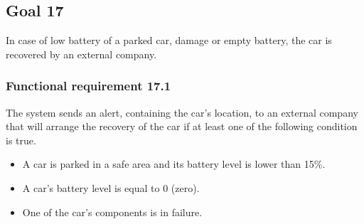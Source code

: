 \subsection{Goal 17}
In case of low battery of a parked car, damage or empty battery, the car is recovered by an external company. 

\setcounter{secnumdepth}{3}
\subsubsection{Functional requirement 17.1}
The system sends an alert, containing the car's location, to an external company that will arrange the recovery of the car if at least one of the following condition is true.

\begin{itemize}
	\item A car is parked in a safe area and its battery level is lower than 15\%.
	\item A car's battery level is equal to 0 (zero).
	\item One of the car's components is in failure.
\end{itemize}

